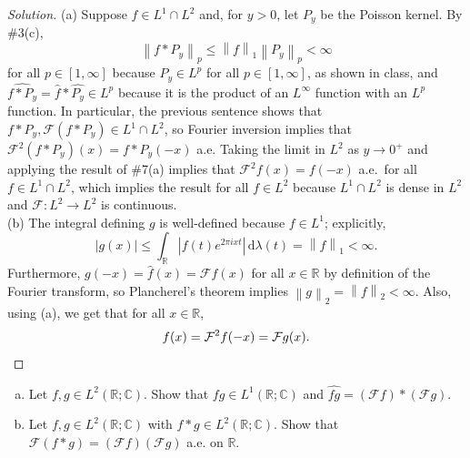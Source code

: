 \documentclass[10pt]{article}
\newcommand{\dd}{\,\mathrm{d}}
\providecommand{\CC}{\mathbb C}
\providecommand{\RR}{\mathbb R}
\providecommand{\ii}{\item}
\newcommand{\what}{\widehat}
\newenvironment{soln}{\begin{proof}[Solution]}{\end{proof}}
\providecommand{\abs}[1]{\left\lvert #1\right\rvert}
\providecommand{\norm}[1]{\left\| #1\right\|}
\begin{document}
\begin{soln}
    (a) Suppose $f\in L^1\cap L^2$
    and, for $y>0$, let $P_y$ be the Poisson kernel.
    By \#3(c),
    \[
	\norm{f*P_y}_p\le \norm{f}_1\norm{P_y}_p < \infty
    \]
    for all $p\in[1,\infty]$ because $P_y\in L^p$
    for all $p\in[1,\infty]$, as shown in class,
    and $\what{f*P_y} = \what f*\what{P_y}\in L^p$
    because it is the product of an $L^\infty$ function with an $L^p$ function.
    In particular, the previous sentence shows that
    $f*P_y,\mathcal F(f*P_y)\in L^1\cap L^2$, so Fourier inversion implies that
    $\mathcal F^2(f*P_y)(x) = f*P_y(-x)$ a.e.
    Taking the limit in $L^2$ as $y\to 0^+$ and applying
    the result of \#7(a) implies that
    $\mathcal F^2 f(x) = f(-x)$ a.e.\ for all $f\in L^1\cap L^2$,
    which implies the result for all $f\in L^2$ because
    $L^1\cap L^2$ is dense in $L^2$ and $\mathcal F\colon L^2\to L^2$ is continuous.
    \\

    (b) The integral defining $g$ is well-defined because $f\in L^1$; explicitly,
    \begin{equation*}
	\abs{g(x)} \le \int_\RR\abs{f(t)e^{2\pi ixt}}\dd\lambda(t)
	= \norm{f}_1 < \infty.
    \end{equation*}
    Furthermore, $g(-x) = \what f(x) = \mathcal Ff(x)$ for all $x\in\RR$
    by definition of the Fourier transform,
    so Plancherel's theorem implies $\norm{g}_2 = \norm{f}_2 < \infty$.
    Also, using (a), we get that for all $x\in\RR$,
    \begin{equation*}
        f(x) = \mathcal F^2f(-x) = \mathcal Fg(x).\qedhere
    \end{equation*}
\end{soln}

\pagebreak
\begin{problem}
    \begin{enumerate}[(a)]
	\ii Let $f,g\in L^2(\RR;\CC)$. Show that $fg\in L^1(\RR;\CC)$ and
	$\what{fg} = (\mathcal Ff)*(\mathcal Fg)$.
	\ii Let $f,g\in L^2(\RR;\CC)$ with $f*g\in L^2(\RR;\CC)$.
	Show that $\mathcal F(f*g) = (\mathcal Ff)(\mathcal Fg)$ a.e. on $\RR$.
    \end{enumerate}
\end{problem}
\end{document}
